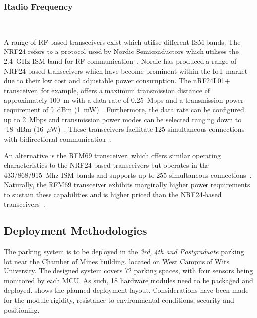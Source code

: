 \documentclass[10pt,twocolumn]{witseiepaper}
\begin{document}
		\subsubsection{Radio Frequency} $   $
		
			A range of RF-based transceivers exist which utilise different ISM bands. The NRF24 refers to a protocol used by Nordic Semiconductors which utilises the 2.4~GHz ISM band for RF communication~\cite{nrf24}. Nordic has produced a range of NRF24 based transceivers which have become prominent within the IoT market due to their low cost and adjustable power consumption. The nRF24L01+ transceiver, for example, offers a maximum transmission distance of approximately 100~m with a data rate of 0.25~Mbps and a transmission power requirement of 0~dBm (1~mW)~\cite{nrf24}. Furthermore, the data rate can be configured up to 2~Mbps and transmission power modes can be selected ranging down to -18~dBm (16~$\mu$W)~\cite{nrf24}. These transceivers facilitate 125 simultaneous connections with bidirectional communication~\cite{nrf24}.
			
			An alternative is the RFM69 transceiver, which offers similar operating characteristics to the NRF24-based transceivers but operates in the 433/868/915~Mhz ISM bands and supports up to 255 simultaneous connections~\cite{rfm69}. Naturally, the RFM69 transceiver exhibits marginally higher power requirements to sustain these capabilities and is higher priced than the NRF24-based transceivers~\cite{rfm69}.
	
	\subsection{Deployment Methodologies}
		The parking system is to be deployed in the \textit{3rd, 4th and Postgraduate} parking lot near the Chamber of Mines building, located on West Campus of Wits University. The designed system covers 72 parking spaces, with four sensors being monitored by each MCU. As such, 18 hardware modules need to be packaged and deployed.  shows the planned deployment layout. Considerations have been made for the module rigidity, resistance to environmental conditions, security and positioning.
		
\end{document}
